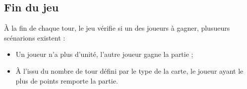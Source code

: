 \documentclass[a4paper,12pt]{article}
\begin{document}
\subsection{Fin du jeu}
À la fin de chaque tour, le jeu vérifie si un des joueurs à gagner, plusueurs scénarions existent :
\begin{itemize}
\item Un joueur n'a plus d'unité, l'autre joueur gagne la partie ;
\item À l'issu du nombre de tour défini par le type de la carte, le joueur ayant le plus de points remporte la partie.
\end{itemize}
\end{document}
